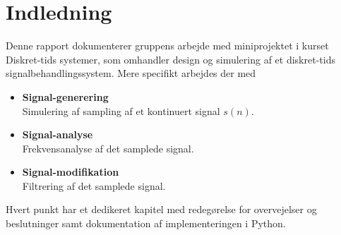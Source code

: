 \chapter{Indledning}
Denne rapport dokumenterer gruppens arbejde med miniprojektet i kurset Diskret-tids systemer, som omhandler design og simulering af et diskret-tids signalbehandlingssystem. Mere specifikt arbejdes der med
\begin{itemize}
\setlength\itemsep{0em}
\item \textbf{Signal-generering}\\
Simulering af sampling af et kontinuert signal $s(n)$.
\item \textbf{Signal-analyse}\\
Frekvensanalyse af det samplede signal.
\item \textbf{Signal-modifikation}\\
Filtrering af det samplede signal.
\end{itemize}
Hvert punkt har et dedikeret kapitel med redegørelse for overvejelser og beslutninger samt dokumentation af implementeringen i Python.